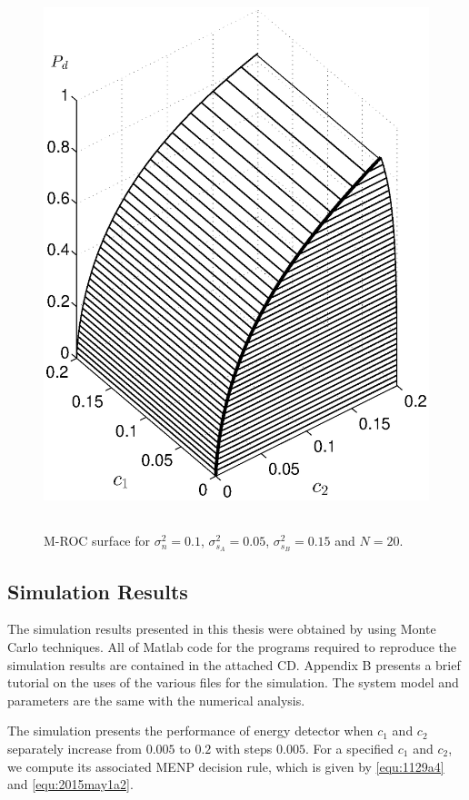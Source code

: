 \begin{figure}[!t]
\centering
\includegraphics[width=12cm, height=16cm]{4/mathc1c2pd.eps}
\caption{M-ROC surface for $\sigma_n^2 = 0.1$, $\sigma_{s_A}^2=0.05$, $\sigma_{s_B}^2=0.15$ and $N = 20$.}
\label{pic:1201a1}
\end{figure}

\subsection{Simulation Results}
The simulation results presented in this thesis were obtained by using Monte Carlo techniques. All of Matlab code for the programs required to reproduce the simulation results are contained in the attached CD. Appendix B presents a brief tutorial on the uses of the various files for the simulation. The system model and parameters are the same with the numerical analysis.

The simulation presents the performance of energy detector when $c_1$ and $c_2$ separately increase from $0.005$ to $0.2$ with steps $0.005$. For a specified $c_1$ and $c_2$, we compute  its associated MENP decision rule, which is given by \eqref{equ:1129a4} and \eqref{equ:2015may1a2}. 

